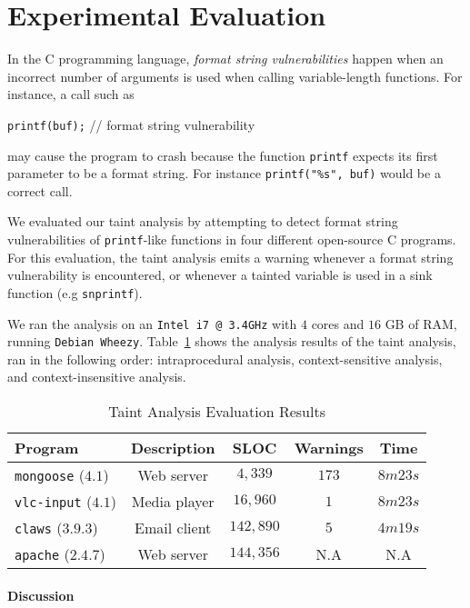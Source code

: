\section{Experimental Evaluation}\label{sec:evaluation}

In the C programming language, \textit{format string vulnerabilities}
happen when an incorrect number of arguments is used when
calling variable-length functions. For instance, a call
such as
\begin{center}
{\tt printf(buf);} // format string vulnerability
\end{center}
may cause the program to crash because the function \texttt{printf}
expects its first parameter to be a format string. For
instance {\tt printf("\%s", buf)} would be a correct call.

We evaluated our taint analysis by attempting to detect
format string vulnerabilities of \texttt{printf}-like functions
in four different open-source C programs.
For this evaluation, the taint analysis emits a warning
whenever a format string vulnerability is encountered,
or whenever a tainted variable is used in a sink function
(e.g \texttt{snprintf}).

We ran the analysis on an \texttt{Intel i7 @ 3.4GHz} with
$4$ cores and $16$ GB of RAM, running {\tt Debian Wheezy}.
Table~\ref{tab:results} shows the analysis results of the
taint analysis, ran in the following order: intraprocedural
analysis, context-sensitive analysis, and context-insensitive
analysis.
\begin{table}[!hbtp]
\centering
\begin{tabular}{|l|c|c|c|c|}
\hline
{\bf Program}				&	{\bf Description}	&	{\bf SLOC}	& {\bf Warnings}	&	{\bf Time}	\\ \hline
{\tt mongoose}	($4.1$)		&	Web server			&	$4,339$		&	$173$			&	$8m23s$ 	\\ %
{\tt vlc-input}	($4.1$)		&	Media player		&	$16,960$	&	$1$				&	$8m23s$ 	\\ %
{\tt claws}		($3.9.3$)	&	Email client		& 	$142,890$ 	&	$5$				&	$4m19s$		\\ %
{\tt apache}	($2.4.7$)	&	Web server			&	$144,356$	&	N.A				&	N.A	 		\\ \hline
\end{tabular}\caption{Taint Analysis Evaluation Results}\label{tab:results}
\end{table}

\paragraph{Discussion}

